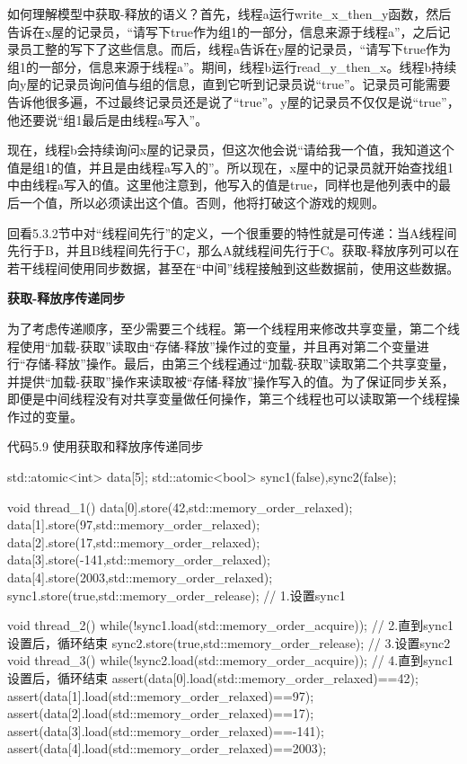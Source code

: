 如何理解模型中获取-释放的语义？首先，线程a运行write\_x\_then\_y函数，然后告诉在x屋的记录员，“请写下true作为组1的一部分，信息来源于线程a”，之后记录员工整的写下了这些信息。而后，线程a告诉在y屋的记录员，“请写下true作为组1的一部分，信息来源于线程a”。期间，线程b运行read\_y\_then\_x。线程b持续向y屋的记录员询问值与组的信息，直到它听到记录员说“true”。记录员可能需要告诉他很多遍，不过最终记录员还是说了“true”。y屋的记录员不仅仅是说“true”，他还要说“组1最后是由线程a写入”。

现在，线程b会持续询问x屋的记录员，但这次他会说“请给我一个值，我知道这个值是组1的值，并且是由线程a写入的”。所以现在，x屋中的记录员就开始查找组1中由线程a写入的值。这里他注意到，他写入的值是true，同样也是他列表中的最后一个值，所以必须读出这个值。否则，他将打破这个游戏的规则。

回看5.3.2节中对“线程间先行”的定义，一个很重要的特性就是可传递：当A线程间先行于B，并且B线程间先行于C，那么A就线程间先行于C。获取-释放序列可以在若干线程间使用同步数据，甚至在“中间”线程接触到这些数据前，使用这些数据。

\textbf{获取-释放序传递同步}

为了考虑传递顺序，至少需要三个线程。第一个线程用来修改共享变量，第二个线程使用“加载-获取”读取由“存储-释放”操作过的变量，并且再对第二个变量进行“存储-释放”操作。最后，由第三个线程通过“加载-获取”读取第二个共享变量，并提供“加载-获取”操作来读取被“存储-释放”操作写入的值。为了保证同步关系，即便是中间线程没有对共享变量做任何操作，第三个线程也可以读取第一个线程操作过的变量。

代码5.9 使用获取和释放序传递同步

\begin{cpp}
std::atomic<int> data[5];
std::atomic<bool> sync1(false),sync2(false);

void thread_1()
{
  data[0].store(42,std::memory_order_relaxed);
  data[1].store(97,std::memory_order_relaxed);
  data[2].store(17,std::memory_order_relaxed);
  data[3].store(-141,std::memory_order_relaxed);
  data[4].store(2003,std::memory_order_relaxed);
  sync1.store(true,std::memory_order_release);  // 1.设置sync1
}

void thread_2()
{
  while(!sync1.load(std::memory_order_acquire));  // 2.直到sync1设置后，循环结束
  sync2.store(true,std::memory_order_release);  // 3.设置sync2
}
void thread_3()
{
  while(!sync2.load(std::memory_order_acquire));   // 4.直到sync1设置后，循环结束
  assert(data[0].load(std::memory_order_relaxed)==42);
  assert(data[1].load(std::memory_order_relaxed)==97);
  assert(data[2].load(std::memory_order_relaxed)==17);
  assert(data[3].load(std::memory_order_relaxed)==-141);
  assert(data[4].load(std::memory_order_relaxed)==2003);
}
\end{cpp}

